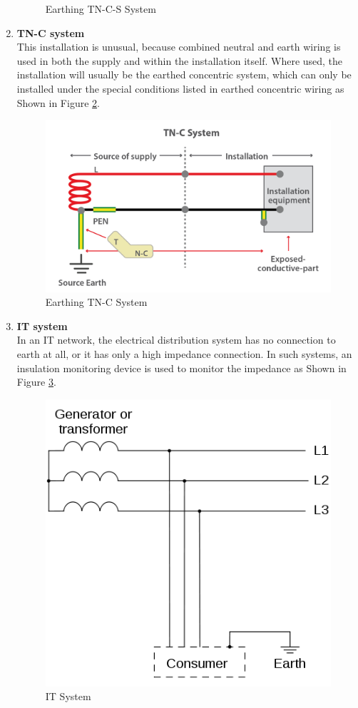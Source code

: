 \documentclass[12pt,fleqn]{book} %
\begin{document}
\begin{enumerate}
\begin{figure}[!h]
    \caption{Earthing TN-C-S System}
    \label{fig:earth 5}
\end{figure}
    \item \textbf{TN-C system}
    \\ This installation is unusual, because combined neutral and earth wiring is used in both the supply and within the installation itself. Where used, the installation will usually be the earthed concentric system, which can only be installed under the special conditions listed in earthed concentric wiring as Shown in Figure \ref{fig:earth 6}.
    \begin{figure}[!h]
    \centering
    \includegraphics[width=0.8\linewidth]{earth 6.png}
    \caption{Earthing TN-C System}
    \label{fig:earth 6}
\end{figure}
    \item \textbf{IT system}
    \\ In an IT network, the electrical distribution system has no connection to earth at all, or it has only a high impedance connection. In such systems, an insulation monitoring device is used to monitor the impedance as Shown in Figure \ref{fig:earth 7}.
    \begin{figure}[!h]
    \centering
    \includegraphics[width=0.8\linewidth]{earth 7.png}
    \caption{IT System}
    \label{fig:earth 7}
\end{figure}
\end{enumerate}
\end{document}

